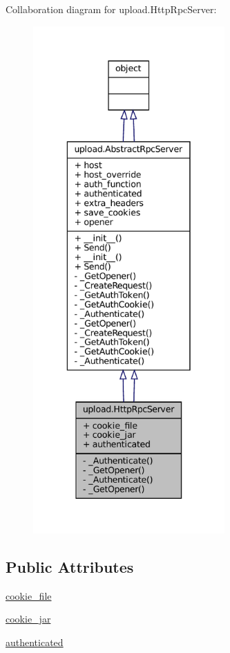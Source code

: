 Collaboration diagram for upload.\+Http\+Rpc\+Server\+:
\nopagebreak
\begin{figure}[H]
\begin{center}
\leavevmode
\includegraphics[height=550pt]{classupload_1_1HttpRpcServer__coll__graph}
\end{center}
\end{figure}
\subsection*{Public Attributes}
\begin{DoxyCompactItemize}
\item 
\hyperlink{classupload_1_1HttpRpcServer_ad5c1a730c030f9d3b5f70c2e0d8b9a1d}{cookie\+\_\+file}
\item 
\hyperlink{classupload_1_1HttpRpcServer_a1b9c9af7f0a46afd84a9d524782323bf}{cookie\+\_\+jar}
\item 
\hyperlink{classupload_1_1HttpRpcServer_aaa356e2491537dd0d4bfc5b1bb0fec96}{authenticated}
\end{DoxyCompactItemize}
